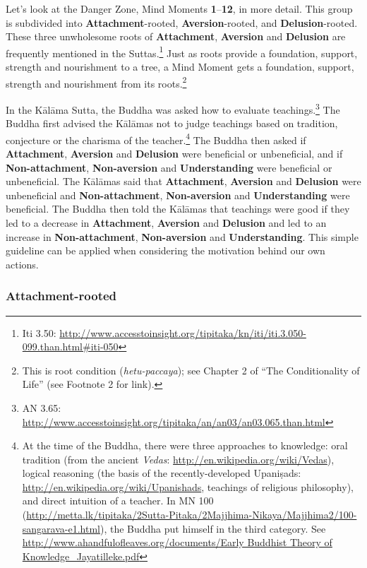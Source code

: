 Let’s look at the Danger Zone, Mind Moments \textbf{1}--\textbf{12}, in more detail. This group is subdivided into \textbf{Attachment}-rooted, \textbf{Aversion}-rooted, and \textbf{Delusion}-rooted. These three unwholesome roots of \textbf{Attachment}, \textbf{Aversion} and \textbf{Delusion} are frequently  mentioned in the Suttas.\footnote{Iti 3.50: \url{http://www.accesstoinsight.org/tipitaka/kn/iti/iti.3.050-099.than.html\#iti-050}} Just as roots provide a foundation, support, strength and nourishment to a tree, a Mind Moment gets a foundation, support, strength and nourishment from its roots.\footnote{This is root condition (\textit{hetu-paccaya}); see Chapter 2 of “The Conditionality of Life” (see Footnote 2 for link).}

\pagebreak

In the Kālāma Sutta, the Buddha was asked how to evaluate teachings.\footnote{AN 3.65: \url{http://www.accesstoinsight.org/tipitaka/an/an03/an03.065.than.html}} The Buddha first advised the Kālāmas not to judge teachings based on tradition, conjecture or the charisma of the teacher.\footnote{At the time of the Buddha, there were three approaches to knowledge: oral tradition (from the ancient \textit{Vedas}: \url{http://en.wikipedia.org/wiki/Vedas}), logical reasoning (the basis of the recently-developed Upaniṣads: \url{http://en.wikipedia.org/wiki/Upanishads}, teachings of religious philosophy), and direct intuition of a teacher. In MN 100 (\url{http://metta.lk/tipitaka/2Sutta-Pitaka/2Majjhima-Nikaya/Majjhima2/100-sangarava-e1.html}), the Buddha put himself in the third category. See \url{http://www.ahandfulofleaves.org/documents/Early Buddhist Theory of Knowledge_Jayatilleke.pdf}} The Buddha then asked if \textbf{Attachment}, \textbf{Aversion} and \textbf{Delusion} were beneficial or unbeneficial, and if \textbf{Non-attachment}, \textbf{Non-aversion} and \textbf{Understanding} were beneficial or unbeneficial. The Kālāmas said that \textbf{Attachment}, \textbf{Aversion} and \textbf{Delusion} were unbeneficial and \textbf{Non-attachment}, \textbf{Non-aversion} and \textbf{Understanding} were beneficial. The Buddha then told the Kālāmas that teachings were good if they led to a decrease in \textbf{Attachment}, \textbf{Aversion} and \textbf{Delusion} and led to an increase in \textbf{Non-attachment}, \textbf{Non-aversion} and \textbf{Understanding}. This simple guideline can be applied when considering the motivation behind our own actions.

\subsubsection*{\textbf{Attachment}-rooted}

